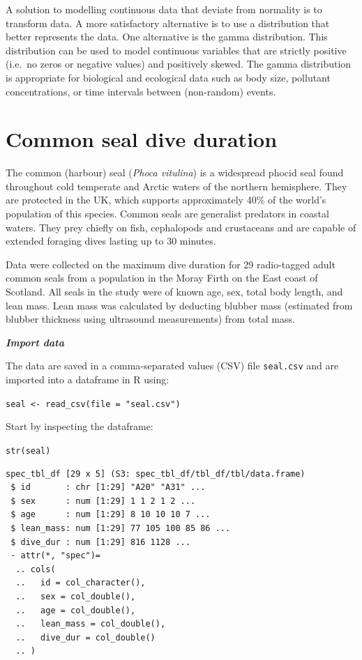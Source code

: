 \documentclass[
]{book}
\begin{document}
A solution to modelling continuous data that deviate from normality is to transform data. A more satisfactory alternative is to use a distribution that better represents the data. One alternative is the gamma distribution. This distribution can be used to model continuous variables that are strictly positive (i.e.~no zeros or negative values) and positively skewed. The gamma distribution is appropriate for biological and ecological data such as body size, pollutant concentrations, or time intervals between (non-random) events.

\hypertarget{common-seal-dive-duration}{%
\section{Common seal dive duration}\label{common-seal-dive-duration}}

The common (harbour) seal (\emph{Phoca vitulina}) is a widespread phocid seal found throughout cold temperate and Arctic waters of the northern hemisphere. They are protected in the UK, which supports approximately 40\% of the world's population of this species. Common seals are generalist predators in coastal waters. They prey chiefly on fish, cephalopods and crustaceans and are capable of extended foraging dives lasting up to 30 minutes.

Data were collected on the maximum dive duration for 29 radio-tagged adult common seals from a population in the Moray Firth on the East coast of Scotland. All seals in the study were of known age, sex, total body length, and lean mass. Lean mass was calculated by deducting blubber mass (estimated from blubber thickness using ultrasound measurements) from total mass.

\emph{\textbf{Import data}}

The data are saved in a comma-separated values (CSV) file \texttt{seal.csv} and are imported into a dataframe in R using:

\texttt{seal\ \textless{}-\ read\_csv(file\ =\ "seal.csv")}

Start by inspecting the dataframe:

\texttt{str(seal)}

\begin{verbatim}
spec_tbl_df [29 x 5] (S3: spec_tbl_df/tbl_df/tbl/data.frame)
 $ id       : chr [1:29] "A20" "A31" ...
 $ sex      : num [1:29] 1 1 2 1 2 ...
 $ age      : num [1:29] 8 10 10 10 7 ...
 $ lean_mass: num [1:29] 77 105 100 85 86 ...
 $ dive_dur : num [1:29] 816 1128 ...
 - attr(*, "spec")=
  .. cols(
  ..   id = col_character(),
  ..   sex = col_double(),
  ..   age = col_double(),
  ..   lean_mass = col_double(),
  ..   dive_dur = col_double()
  .. )
\end{verbatim}
\end{document}
